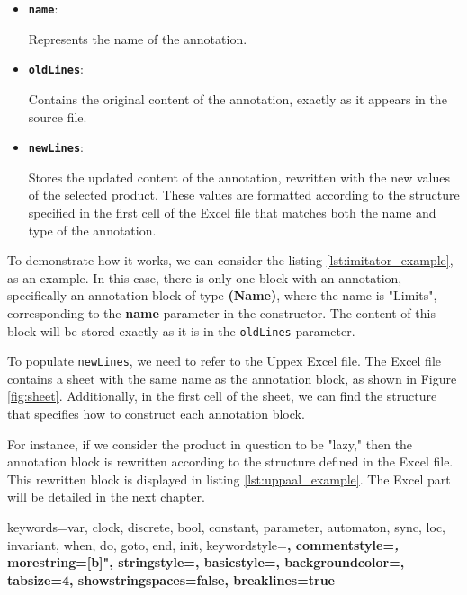 \begin{itemize}
    \item \textbf{\texttt{name}}: 
    
    Represents the name of the annotation.
    \item \textbf{\texttt{oldLines}}: 
    
    Contains the original content of the annotation, exactly as it appears in the source file.
    \item \textbf{\texttt{newLines}}: 
    
    Stores the updated content of the annotation, rewritten with the new values of the selected product. These values are formatted according to the structure specified in the first cell of the Excel file that matches both the name and type of the annotation.
\end{itemize}

To demonstrate how it works, we can consider the listing \ref{lst:imitator_example}, as an example. In this case, there is only one block with an annotation, specifically an annotation block of type \textbf{(Name)}, where the name is "Limits", corresponding to the \textbf{name} parameter in the constructor. The content of this block will be stored exactly as it is in the \texttt{oldLines} parameter.

To populate \texttt{newLines}, we need to refer to the Uppex Excel file. The Excel file contains a sheet with the same name as the annotation block, as shown in Figure \ref{fig:sheet}. Additionally, in the first cell of the sheet, we can find the structure that specifies how to construct each annotation block.

For instance, if we consider the product in question to be "lazy," then the annotation block is rewritten according to the structure defined in the Excel file. This rewritten block is displayed in listing \ref{lst:uppaal_example}. The Excel part will be detailed in the next chapter.



{
    keywords={var, clock, discrete, bool, constant, parameter, automaton, sync, loc, invariant, when, do, goto, end, init},
    keywordstyle=\color{keywordcolor}\bfseries,
    commentstyle=\color{commentcolor}\textit,
    morestring=[b]",
    stringstyle=\color{stringcolor},
    basicstyle=\ttfamily\small,
    backgroundcolor=\color{backgroundcolor},
    tabsize=4,
    showstringspaces=false,
    breaklines=true
}


